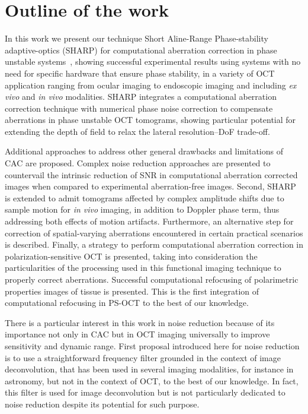 \section{Outline of the work}

In this work we present our technique Short Aline-Range Phase-stability adaptive-optics (SHARP) for computational aberration correction in phase unstable systems~\cite{Ruiz-Lopera2020_Computational}, showing successful experimental results using systems with no need for specific hardware that ensure phase stability, in a variety of OCT application ranging from ocular imaging to endoscopic imaging and including \textit{ex vivo} and \textit{in vivo} modalities. SHARP integrates a computational aberration correction technique with numerical phase noise correction to compensate aberrations in phase unstable OCT tomograms, showing particular potential for extending the depth of field to relax the lateral resolution--DoF trade-off.

Additional approaches to address other general drawbacks and limitations of CAC are proposed. Complex noise reduction approaches are presented to countervail the intrinsic reduction of SNR in computational aberration corrected images when compared to experimental aberration-free images. Second, SHARP is extended to admit tomograms affected by complex amplitude shifts due to sample motion for \textit{in vivo} imaging, in addition to Doppler phase term, thus addressing both effects of motion artifacts. Furthermore, an alternative step for correction of spatial-varying aberrations encountered in certain practical scenarios is described. Finally, a strategy to perform computational aberration correction in polarization-sensitive OCT is presented, taking into consideration the particularities of the processing used in this functional imaging technique to properly correct aberrations. Successful computational refocusing of polarimetric properties images of tissue is presented. This is the first integration of computational refocusing in PS-OCT to the best of our knowledge.

There is a particular interest in this work in noise reduction because of its importance not only in CAC but in OCT imaging universally to improve sensitivity and dynamic range. First proposal introduced here for noise reduction is to use a straightforward frequency filter grounded in the context of image deconvolution, that has been used in several imaging modalities, for instance in astronomy, but not in the context of OCT, to the best of our knowledge. In fact, this filter is used for image deconvolution but is not particularly dedicated to noise reduction despite its potential for such purpose.

